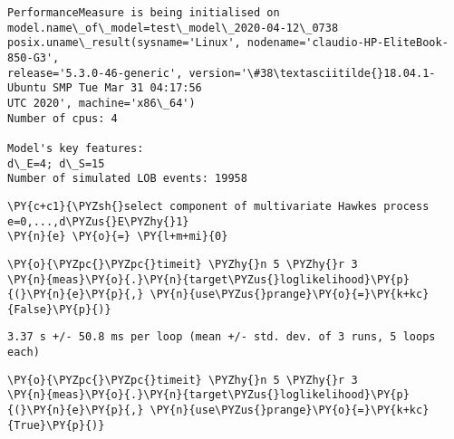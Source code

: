 \documentclass[10pt, article,table]{article}
\begin{document}
\begin{tcolorbox}[breakable, size=fbox, boxrule=.5pt, pad at break*=1mm, opacityfill=0]
\begin{Verbatim}[commandchars=\\\{\}, fontsize=\small]
PerformanceMeasure is being initialised on
model.name\_of\_model=test\_model\_2020-04-12\_0738
posix.uname\_result(sysname='Linux', nodename='claudio-HP-EliteBook-850-G3',
release='5.3.0-46-generic', version='\#38\textasciitilde{}18.04.1-Ubuntu SMP Tue Mar 31 04:17:56
UTC 2020', machine='x86\_64')
Number of cpus: 4

Model's key features:
d\_E=4; d\_S=15
Number of simulated LOB events: 19958
    \end{Verbatim}
\end{tcolorbox}
\begin{tcolorbox}[breakable, size=fbox, boxrule=1pt, pad at break*=1mm,colback=cellbackground, colframe=cellborder]
\begin{Verbatim}[commandchars=\\\{\}, fontsize=\small]
\PY{c+c1}{\PYZsh{}select component of multivariate Hawkes process e=0,...,d\PYZus{}E\PYZhy{}1}
\PY{n}{e} \PY{o}{=} \PY{l+m+mi}{0}
\end{Verbatim}
\end{tcolorbox}
\begin{tcolorbox}[breakable, size=fbox, boxrule=1pt, pad at break*=1mm,colback=cellbackground, colframe=cellborder]
\begin{Verbatim}[commandchars=\\\{\}, fontsize=\small]
\PY{o}{\PYZpc{}\PYZpc{}timeit} \PYZhy{}n 5 \PYZhy{}r 3
\PY{n}{meas}\PY{o}{.}\PY{n}{target\PYZus{}loglikelihood}\PY{p}{(}\PY{n}{e}\PY{p}{,} \PY{n}{use\PYZus{}prange}\PY{o}{=}\PY{k+kc}{False}\PY{p}{)}
\end{Verbatim}
\end{tcolorbox}
\begin{tcolorbox}[breakable, size=fbox, boxrule=.5pt, pad at break*=1mm, opacityfill=0]
\begin{Verbatim}[commandchars=\\\{\}, fontsize=\small]
3.37 s +/- 50.8 ms per loop (mean +/- std. dev. of 3 runs, 5 loops each)
    \end{Verbatim}
\end{tcolorbox}
\begin{tcolorbox}[breakable, size=fbox, boxrule=1pt, pad at break*=1mm,colback=cellbackground, colframe=cellborder]
\begin{Verbatim}[commandchars=\\\{\}, fontsize=\small]
\PY{o}{\PYZpc{}\PYZpc{}timeit} \PYZhy{}n 5 \PYZhy{}r 3
\PY{n}{meas}\PY{o}{.}\PY{n}{target\PYZus{}loglikelihood}\PY{p}{(}\PY{n}{e}\PY{p}{,} \PY{n}{use\PYZus{}prange}\PY{o}{=}\PY{k+kc}{True}\PY{p}{)}
\end{Verbatim}
\end{tcolorbox}
\end{document}
